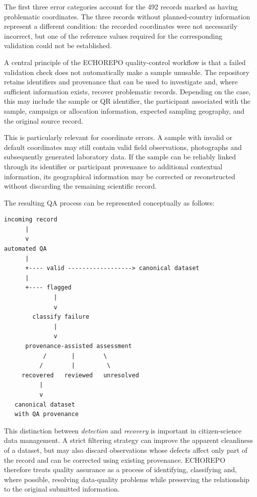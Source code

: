 The first three error categories account for the 492 records marked as having problematic coordinates. The three records without planned-country information represent a different condition: the recorded coordinates were not necessarily incorrect, but one of the reference values required for the corresponding validation could not be established.

A central principle of the ECHOREPO quality-control workflow is that a failed validation check does not automatically make a sample unusable. The repository retains identifiers and provenance that can be used to investigate and, where sufficient information exists, recover problematic records. Depending on the case, this may include the sample or QR identifier, the participant associated with the sample, campaign or allocation information, expected sampling geography, and the original source record.

This is particularly relevant for coordinate errors. A sample with invalid or default coordinates may still contain valid field observations, photographs and subsequently generated laboratory data. If the sample can be reliably linked through its identifier or participant provenance to additional contextual information, its geographical information may be corrected or reconstructed without discarding the remaining scientific record.

The resulting QA process can be represented conceptually as follows:

\begin{verbatim}
incoming record
      |
      v
automated QA
      |
      +---- valid ------------------> canonical dataset
      |
      +---- flagged
              |
              v
        classify failure
              |
              v
      provenance-assisted assessment
           /       |        \
          /        |         \
     recovered   reviewed   unresolved
          |
          v
   canonical dataset
   with QA provenance
\end{verbatim}

This distinction between \emph{detection} and \emph{recovery} is important in citizen-science data management. A strict filtering strategy can improve the apparent cleanliness of a dataset, but may also discard observations whose defects affect only part of the record and can be corrected using existing provenance. ECHOREPO therefore treats quality assurance as a process of identifying, classifying and, where possible, resolving data-quality problems while preserving the relationship to the original submitted information.

